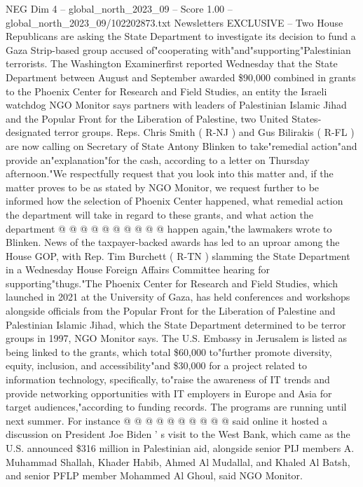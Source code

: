 \begin{textsample}{NEG Dim 4 – global\_north\_2023\_09 – Score 1.00 – global\_north\_2023\_09/102202873.txt}  \label{ex:f4_neg_041}
Newsletters EXCLUSIVE -- Two House Republicans are asking the State Department to investigate its decision to fund a Gaza Strip-based group accused of"cooperating with"and"supporting"Palestinian terrorists.
The Washington Examinerfirst reported Wednesday that the State Department between August and September awarded \$90,000 combined in grants to the Phoenix Center for Research and Field Studies, an entity the Israeli watchdog NGO Monitor says partners with leaders of Palestinian Islamic Jihad and the Popular Front for the Liberation of Palestine, two United States-designated terror groups.
Reps.
Chris Smith ( R-NJ ) and Gus Bilirakis ( R-FL ) are now calling on Secretary of State Antony Blinken to take"remedial action"and provide an"explanation"for the cash, according to a letter on Thursday afternoon."We respectfully request that you look into this matter and, if the matter proves to be as stated by NGO Monitor, we request further to be informed how the selection of Phoenix Center happened, what remedial action the department will take in regard to these grants, and what action the department @ @ @ @ @ @ @ @ @ @ happen again,"the lawmakers wrote to Blinken.
News of the taxpayer-backed awards has led to an uproar among the House GOP, with Rep.
Tim Burchett ( R-TN ) slamming the State Department in a Wednesday House Foreign Affairs Committee hearing for supporting"thugs."The Phoenix Center for Research and Field Studies, which launched in 2021 at the University of Gaza, has held conferences and workshops alongside officials from the Popular Front for the Liberation of Palestine and Palestinian Islamic Jihad, which the State Department determined to be terror groups in 1997, NGO Monitor says.
The U.S.
Embassy in Jerusalem is listed as being linked to the grants, which total \$60,000 to"further promote diversity, equity, inclusion, and accessibility"and \$30,000 for a project related to information technology, specifically, to"raise the awareness of IT trends and provide networking opportunities with IT employers in Europe and Asia for target audiences,"according to funding records.
The programs are running until next summer.
For instance @ @ @ @ @ @ @ @ @ @ said online it hosted a discussion on President Joe Biden ' s visit to the West Bank, which came as the U.S. announced \$316 million in Palestinian aid, alongside senior PIJ members A.
Muhammad Shallah, Khader Habib, Ahmed Al Mudallal, and Khaled Al Batsh, and senior PFLP member Mohammed Al Ghoul, said NGO Monitor.

\end{textsample}
